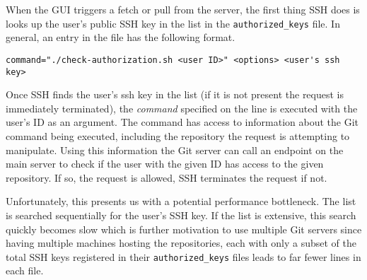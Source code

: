 When the GUI triggers a fetch or pull from the server, the first thing SSH does is looks up the user's public SSH key in the list in the \texttt{authorized\_keys} file. In general, an entry in the file has the following format.

\begin{verbatim}
command="./check-authorization.sh <user ID>" <options> <user's ssh key>
\end{verbatim}

Once SSH finds the user's ssh key in the list (if it is not present the request is immediately terminated), the \emph{command} specified on the line is executed with the user's ID as an argument. The command has access to information about the Git command being executed, including the repository the request is attempting to manipulate. Using this information the Git server can call an endpoint on the main server to check if the user with the given ID has access to the given repository. If so, the request is allowed, SSH terminates the request if not.

Unfortunately, this presents us with a potential performance bottleneck. The list is searched sequentially for the user's SSH key. If the list is extensive, this search quickly becomes slow which is further motivation to use multiple Git servers since having multiple machines hosting the repositories, each with only a subset of the total SSH keys registered in their \texttt{authorized\_keys} files leads to far fewer lines in each file. 


